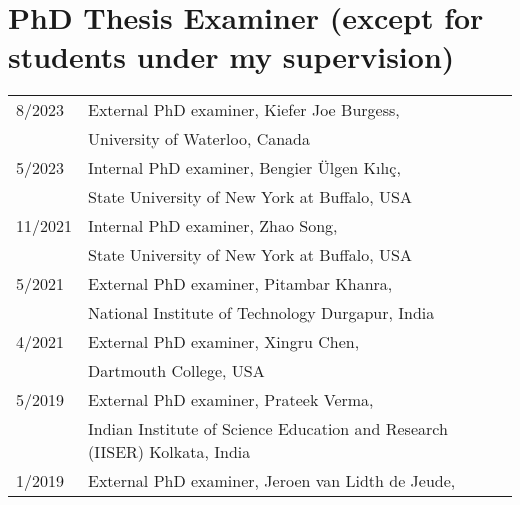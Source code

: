 \documentclass[11pt,letter]{article}
\renewenvironment{itemize}{
  \begin{list}{}{
    \setlength{\leftmargin}{1.5em}
    \setlength{\itemsep}{0.25em}
    \setlength{\parskip}{0pt}
    \setlength{\parsep}{0.25em}
  }
}{
  \end{list}
}
\begin{document}
\begin{itemize}




\bigskip

\section*{\bf \normalsize PhD Thesis Examiner (except for students under my supervision)}

\begin{tabular}{ll}
%
%
8/2023 & External PhD examiner, Kiefer Joe Burgess,\\
& University of Waterloo, Canada\\
%
5/2023 & Internal PhD examiner, Bengier \"{U}lgen K{\i}l{\i}\c{c},\\
& State University of New York at Buffalo, USA\\
%
11/2021 & Internal PhD examiner, Zhao Song,\\
& State University of New York at Buffalo, USA\\
%
5/2021 & External PhD examiner, Pitambar Khanra,\\ 
& National Institute of Technology Durgapur, India\\
%
4/2021 & External PhD examiner, Xingru Chen,\\ 
& Dartmouth College, USA\\
%
5/2019 & External PhD examiner, Prateek Verma,\\ 
& Indian Institute of Science Education and Research (IISER) Kolkata, India\\
%
1/2019 & External PhD examiner, Jeroen van Lidth de Jeude,\\

\end{tabular}
\end{itemize}
\end{document}
